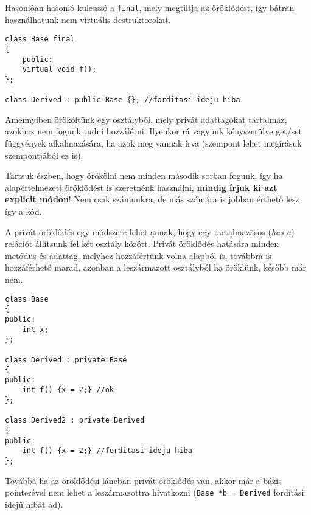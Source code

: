 \documentclass[a4paper,11.5pt,table]{article}
\begin{document}
	\smallskip
	Hasonlóan hasonló kulcsszó a \texttt{final}, mely megtiltja az öröklődést, így bátran használhatunk nem virtuális destruktorokat.
	
	\begin{lstlisting}
class Base final
{
	public:
	virtual void f();
};

class Derived : public Base {}; //forditasi ideju hiba
	\end{lstlisting}
	Amennyiben örököltünk egy osztályból, mely privát adattagokat tartalmaz, azokhoz nem fogunk tudni hozzáférni. Ilyenkor rá vagyunk kényszerülve get/set függvények alkalmazására, ha azok meg vannak írva (szempont lehet megírásuk szempontjából ez is).
	
	\medskip
	Tartsuk észben, hogy örökölni nem minden második sorban fogunk, így ha alapértelmezett öröklődést is szeretnénk használni, \textbf{mindig írjuk ki azt explicit módon}! Nem csak számunkra, de más számára is jobban érthető lesz így a kód.
	
	\medskip
	A privát öröklődés egy módszere lehet annak, hogy egy tartalmazásos (\textit{has a}) relációt állítsunk fel két osztály között. Privát öröklődés hatására minden metódus és adattag, melyhez hozzáfértünk volna alapból is, továbbra is hozzáférhető marad, azonban a leszármazott osztályból ha öröklünk, később már nem.
	\begin{lstlisting}
class Base
{
public:
	int x;
};

class Derived : private Base
{
public:
	int f() {x = 2;} //ok
};

class Derived2 : private Derived
{
public:
	int f() {x = 2;} //forditasi ideju hiba
};
	\end{lstlisting}
	Továbbá ha az öröklődési láncban privát öröklődés van, akkor már a bázis pointerével nem lehet a leszármazottra hivatkozni (\texttt{Base *b = Derived} fordítási idejű hibát ad).
	\medskip
	
\end{document}
